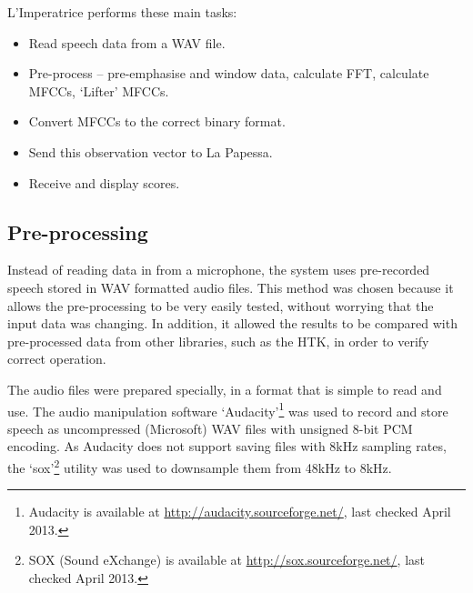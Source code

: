 	L'Imperatrice performs these main tasks:
	\begin{itemize}
		\item Read speech data from a WAV file.
		\item Pre-process -- pre-emphasise and window data, calculate FFT, calculate MFCCs, `Lifter' MFCCs.
		\item Convert MFCCs to the correct binary format.
		\item Send this observation vector to La Papessa.
		\item Receive and display scores.
	\end{itemize}


	\subsection{Pre-processing} %
	\label{sub:pre_processing}
		Instead of reading data in from a microphone, the system uses pre-recorded speech stored in WAV formatted audio files.  This method was chosen because it allows the pre-processing to be very easily tested, without worrying that the input data was changing.  In addition, it allowed the results to be compared with pre-processed data from other libraries, such as the HTK, in order to verify correct operation.

		The audio files were prepared specially, in a format that is simple to read and use.  The audio manipulation software `Audacity'\footnote{Audacity is available at \href{http://audacity.sourceforge.net/}{http://audacity.sourceforge.net/}, last checked April 2013.} was used to record and store speech as uncompressed (Microsoft) WAV files with unsigned 8-bit PCM encoding.  As Audacity does not support saving files with 8kHz sampling rates, the `sox'\footnote{SOX (Sound eXchange) is available at \href{http://sox.sourceforge.net/}{http://sox.sourceforge.net/}, last checked April 2013.} utility was used to downsample them from 48kHz to 8kHz.

